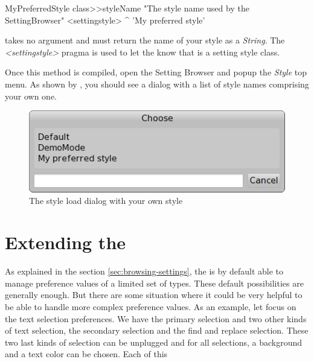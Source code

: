 \documentclass[a4paper,10pt,twoside]{book}
\begin{document}
{\begin{code}{}
MyPreferredStyle class>>styleName
	"The style name used by the SettingBrowser"
	<settingstyle>
	^ 'My preferred style'
\end{code}

 takes no argument and must return the name of your style as a \textit{String}. The \textit{<settingstyle>} pragma is used to let the \setbrowser know that  is a setting style class.

Once this method is compiled, open the Setting Browser and popup the \textit{Style} top menu. As shown by , you should see a dialog with a list of style names comprising your own one.

\begin{figure}[tbh]
\begin{center}
\includegraphics[scale=0.4]{setting-style-load-dialog}
\caption{The style load dialog with your own style}
\end{center}
\end{figure}


\section{Extending the \setbrowser}
\label{sec:ExtendingTheSettingsBrowser}
As explained in the section \ref{sec:browsing-settings}, the \setbrowser is by default able to manage preference values of a limited set of types. These default possibilities are generally enough. But there are some situation where it could be very helpful to be able to handle more complex preference values. As an example, let focus on the text selection preferences. We have the primary selection and two other kinds of text selection, the secondary selection and the find and replace selection. These two last kinds of selection can be unplugged and for all selections, a background and a text color can be chosen. Each of this 



}
\end{document}

